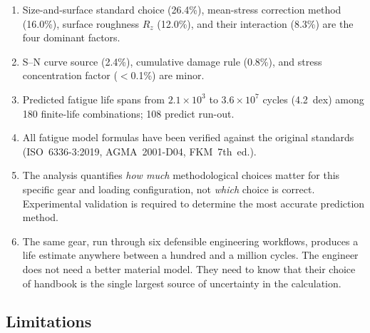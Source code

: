 \documentclass[12pt,a4paper]{article}
\begin{document}
\begin{enumerate}
  \item Size-and-surface standard choice (26.4\%), mean-stress
        correction method (16.0\%), surface roughness $R_z$ (12.0\%),
        and their interaction (8.3\%) are the four dominant factors.
  \item S--N curve source (2.4\%), cumulative damage rule (0.8\%), and
        stress concentration factor ($<$0.1\%) are minor.
  \item Predicted fatigue life spans from $2.1\times10^3$ to
        $3.6\times10^7$ cycles (4.2~dex) among 180 finite-life
        combinations; 108 predict run-out.
  \item All fatigue model formulas have been verified against the original
        standards (ISO~6336-3:2019, AGMA~2001-D04, FKM~7th~ed.).
  \item The analysis quantifies \emph{how much} methodological choices
        matter for this specific gear and loading configuration, not
        \emph{which} choice is correct. Experimental validation is
        required to determine the most accurate prediction method.
  \item The same gear, run through six defensible engineering workflows,
        produces a life estimate anywhere between a hundred and a million
        cycles. The engineer does not need a better material model. They
        need to know that their choice of handbook is the single largest
        source of uncertainty in the calculation.
\end{enumerate}

\subsection{Limitations}
\label{sec:limitations}
\end{document}
